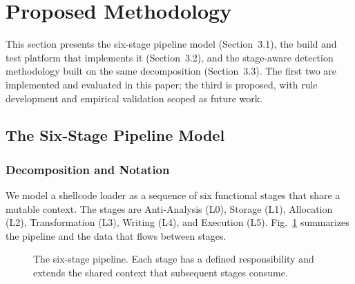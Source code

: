 \section{Proposed Methodology}

This section presents the six-stage pipeline model (Section~3.1), the build and test platform that implements it (Section~3.2), and the stage-aware detection methodology built on the same decomposition (Section~3.3).
The first two are implemented and evaluated in this paper; the third is proposed, with rule development and empirical validation scoped as future work.

\subsection{The Six-Stage Pipeline Model}

\subsubsection{Decomposition and Notation}

We model a shellcode loader as a sequence of six functional stages that share a mutable context.
The stages are Anti-Analysis (L0), Storage (L1), Allocation (L2), Transformation (L3), Writing (L4), and Execution (L5).
Fig.~\ref{fig:pipeline} summarizes the pipeline and the data that flows between stages.

\begin{figure}[htbp]
    \centering
    \setlength{\fboxsep}{8pt}
    \caption{The six-stage pipeline. Each stage has a defined responsibility and extends the shared context that subsequent stages consume.}
    \label{fig:pipeline}
\end{figure}

